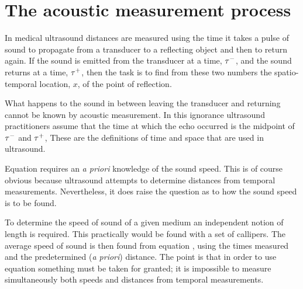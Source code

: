 \section{The acoustic measurement process}\label{sec:introduction}


In medical ultrasound distances are measured using the time it takes a pulse of sound to propagate from a transducer
to a reflecting object and then to return again. 
If the sound is emitted from the transducer at a time, $\tau^-$,
and the sound returns at a time,  $\tau^+$,
then the task is to find from these two numbers the spatio-temporal location, $x$,
of the point of reflection.

What happens to the sound in between leaving the transducer and returning
cannot be known by acoustic measurement.
In this ignorance ultrasound practitioners assume that the time at which the echo 
occurred is the midpoint of $\tau^-$ and $\tau^+$,
These are the definitions of time and space that are used in ultrasound.

Equation  requires an {\em a priori} knowledge of the sound speed.
This is of course obvious because ultrasound attempts to determine distances from temporal measurements.
Nevertheless, 
it does raise the question as to how the sound speed is to be found.

To determine the speed of sound of a given medium an independent notion of length is required.
This practically would be found with a set of callipers.
The average speed of sound is then found from equation ,
using the times measured and the predetermined ({\em a priori})  distance.
The point is that %
in order to use equation  something must be taken for granted; 
it is impossible to measure simultaneously both speeds and distances from temporal measurements.

